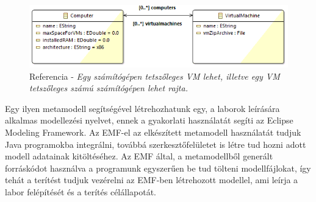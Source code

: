 \vspace{0.5cm}

\begin{figure}[ht!]
	\centering
	\includegraphics[width=150mm, keepaspectratio]{figures/binf_emf_3.png}
	\caption{Referencia - \textit{Egy számítógépen tetszőleges VM lehet, illetve egy VM tetszőleges számú számítógépen lehet rajta.}}
	\label{fig:emfref}
\end{figure}


Egy ilyen metamodell segítségével létrehozhatunk egy, a laborok leírására alkalmas modellezési nyelvet, ennek a gyakorlati használatát segíti az Eclipse Modeling Framework\cite{steinberg2008emf}. Az EMF-el az elkészített metamodell használatát tudjuk Java programokba integrálni, továbbá szerkesztőfelületet is létre tud hozni adott modell adatainak kitöltéséhez. Az EMF által, a metamodellből generált forráskódot használva a programunk egyszerűen be tud tölteni modellfájlokat, így tehát a terítést tudjuk vezérelni az EMF-ben létrehozott modellel, ami leírja a labor felépítését és a terítés célállapotát.